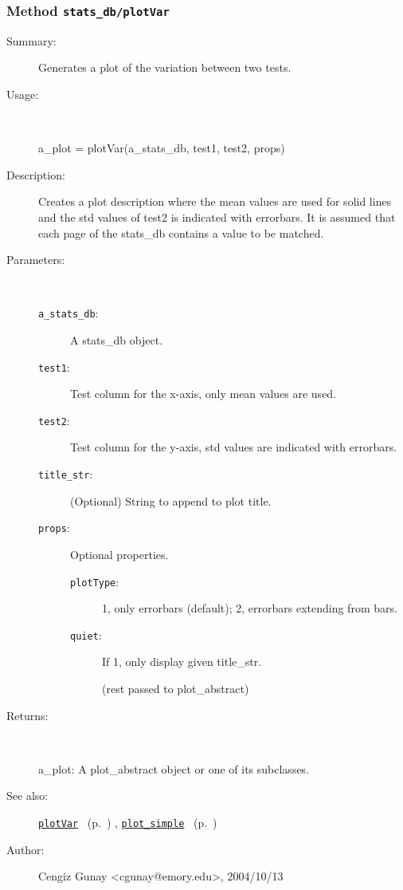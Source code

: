 \subsubsection[Method \texttt{plotVar}]{Method \texttt{stats\_db/plotVar}}%
%
\label{ref_stats_db__plotVar}%
\hypertarget{ref_stats_db__plotVar}{}%
\begin{description}
\item[Summary:]Generates a plot of the variation between two tests.
%
\item[Usage:]~%
\begin{lyxcode}%
a\_plot = plotVar(a\_stats\_db, test1, test2, props)
%
\end{lyxcode}%
%
\item[Description:]%
Creates a plot description where the mean values are used for solid lines
 and the std values of test2 is indicated with errorbars. It is assumed that 
 each page of the stats\_db contains a value to be matched.
\item[Parameters:]~
\begin{description}%
\item[\texttt{a\_stats\_db}:]
 A stats\_db object.
\item[\texttt{test1}:]
 Test column for the x-axis, only mean values are used.
\item[\texttt{test2}:]
 Test column for the y-axis, std values are indicated with errorbars.
\item[\texttt{title\_str}:]
 (Optional) String to append to plot title.
\item[\texttt{props}:]
 Optional properties.
\begin{description}%
\item[\texttt{plotType}:]
 1, only errorbars (default); 2, errorbars extending from bars.
\item[\texttt{quiet}:]
 If 1, only display given title\_str.

(rest passed to plot\_abstract)
\end{description}%
\end{description}%
%
\item[Returns:
]~

	a\_plot: A plot\_abstract object or one of its subclasses.
%
%
\item[See also:]%
\hyperlink{ref_plotVar}{\texttt{plotVar}}%
\ (p.~\pageref{ref_plotVar})%
%
, \hyperlink{ref_plot_simple}{\texttt{plot\_simple}}%
\ (p.~\pageref{ref_plot_simple})%
%
%
\item[Author:]%
Cengiz Gunay <cgunay@emory.edu>, 2004/10/13
%
\end{description}
\methodline%
